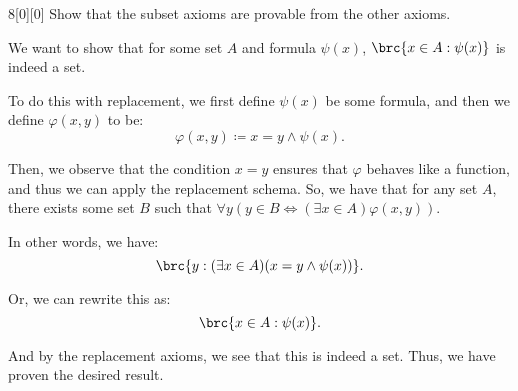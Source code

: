 \documentclass{article}
\begin{document}
\begin{hw}{8}[0][0]
	Show that the subset axioms are provable from the other axioms.
\end{hw}
\begin{solution}
	We want to show that for some set $A$ and formula $\psi(x)$, $\brc{x \in A : \psi(x)}$ is indeed a set.
	
	To do this with replacement, we first define $\psi(x)$ be some formula, and then we define $\varphi(x, y)$ to be: 
	\begin{equation*}
		\varphi(x, y)\coloneq x = y \land \psi(x).
	\end{equation*}

	Then, we observe that the condition $x = y$ ensures that $\varphi$ behaves like a function, and thus we can apply the replacement schema. So, we have that for any set $A$, there exists some set $B$ such that $\forall y(y \in B \iff (\exists x \in A)\varphi(x, y))$.
	
	In other words, we have:
	\begin{equation*}
		\brc{y : (\exists x \in A)(x = y \land \psi(x))}.
	\end{equation*}

	Or, we can rewrite this as:
	\begin{equation*}
		\brc{x \in A : \psi(x)}.
	\end{equation*}

	And by the replacement axioms, we see that this is indeed a set. Thus, we have proven the desired result.
\end{solution}
\end{document}
